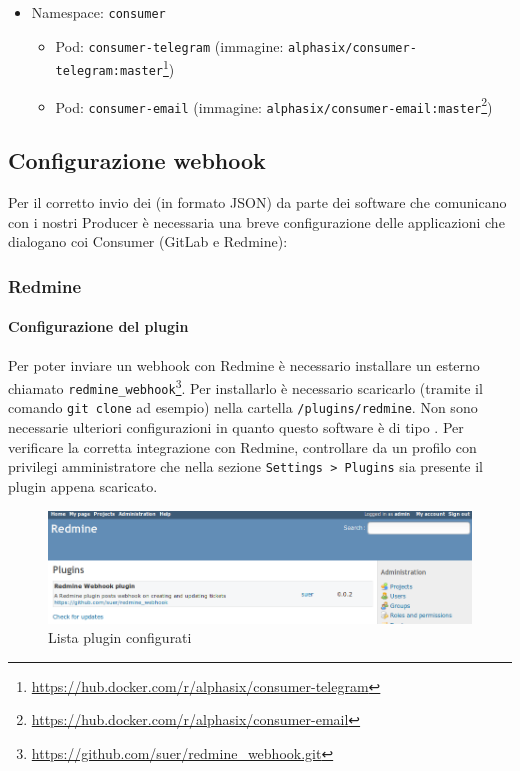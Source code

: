 \begin{itemize}
	\item Namespace: \texttt{consumer}
	\begin{itemize}
		\item Pod: \texttt{consumer-telegram} (immagine: \texttt{alphasix/consumer-telegram:master}\footnote{\url{https://hub.docker.com/r/alphasix/consumer-telegram}})
		\item Pod: \texttt{consumer-email} (immagine: \texttt{alphasix/consumer-email:master}\footnote{\url{https://hub.docker.com/r/alphasix/consumer-email}})
	\end{itemize}
\end{itemize}


\subsection{Configurazione webhook}
Per il corretto invio dei  (in formato JSON) da parte dei software che comunicano con i nostri Producer è necessaria una breve configurazione delle applicazioni che dialogano coi Consumer (GitLab e Redmine):
	
	\subsubsection{Redmine}
	\paragraph{Configurazione del plugin}
	Per poter inviare un webhook con Redmine è necessario installare un  esterno chiamato \texttt{redmine\_webhook}\footnote{\url{https://github.com/suer/redmine_webhook.git}}.
	Per installarlo è necessario scaricarlo (tramite il comando \texttt{git clone} ad esempio) nella cartella \texttt{/plugins/redmine}.
	Non sono necessarie ulteriori configurazioni in quanto questo software è di tipo . %
	Per verificare la corretta integrazione con Redmine, controllare da un profilo con privilegi amministratore che nella sezione \texttt{Settings > Plugins} sia presente il plugin appena scaricato.
	\begin{figure}[H]
		\centering
		\includegraphics[width=13cm]{img/redmine_webhook_admin.png}
		\caption{Lista plugin configurati}
	\end{figure}

